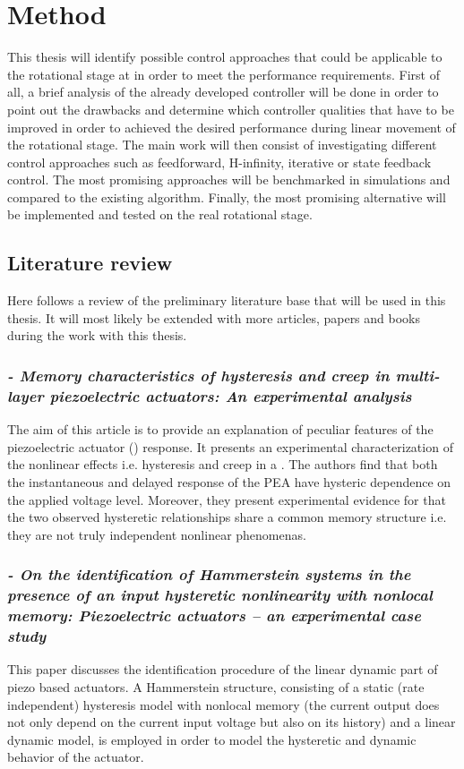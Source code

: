 \chapter{Method}\label{cha:method}
This thesis will identify possible control approaches that could be applicable to the rotational stage at \abbrCERN in order to meet the performance requirements.
First of all, a brief analysis of the already developed controller will be done in order to point out the drawbacks and determine which controller qualities that have to be improved in order to achieved the desired performance during linear movement of the rotational stage. The main work will then consist of investigating different control approaches such as feedforward, H-infinity, iterative or state feedback control. The most promising approaches will be benchmarked in simulations and compared to the existing algorithm. Finally, the most promising alternative will be implemented and tested on the real rotational stage.

\section{Literature review}
Here follows a review of the preliminary literature base that will be used in this thesis. It will most likely be extended with more articles, papers and books during the work with this thesis.

\subsection*{\citep*{Biggio:2014} {\small \emph{- Memory characteristics of hysteresis and creep in multi-layer piezoelectric actuators: An experimental analysis}}}
The aim of this article is to provide an explanation of peculiar features of the piezoelectric actuator (\abbrPEA) response. It presents an experimental characterization of the nonlinear effects i.e. hysteresis and creep in a \abbrPEA. The authors find that both the instantaneous and delayed response of the PEA have hysteric dependence on the applied voltage level.
Moreover, they present experimental evidence for that the two observed hysteretic relationships share a common memory structure i.e. they are not truly independent nonlinear phenomenas.

\subsection*{\citep*{ButcherIdentification:2015}{\small \emph{- On the identification of Hammerstein systems in the presence of an input hysteretic nonlinearity with nonlocal memory: Piezoelectric actuators – an experimental case study}}}
This paper discusses the identification procedure of the linear dynamic part of piezo based actuators. A Hammerstein structure, consisting of a static (rate independent) hysteresis model with nonlocal memory (the current output does not only depend on the current input voltage but also on its history) and a linear dynamic model, is employed in order to model the hysteretic and dynamic behavior of the actuator.

